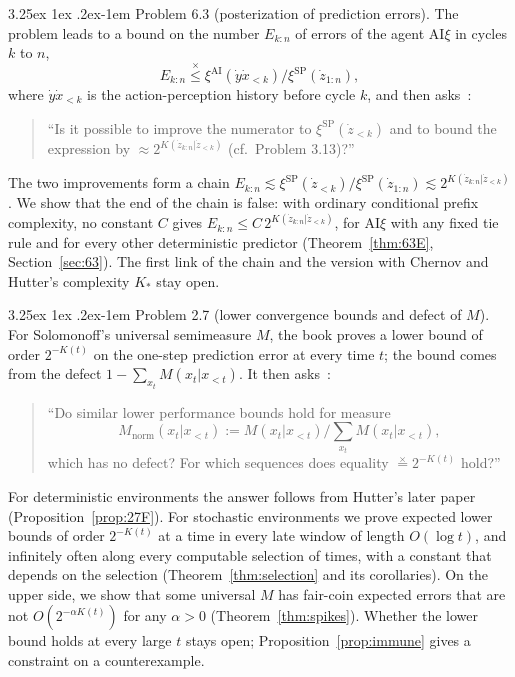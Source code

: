 \documentclass[11pt]{article}
\makeatletter
\renewcommand\paragraph{\@startsection{paragraph}{4}{\z@}%
  {3.25ex \@plus1ex \@minus.2ex}{-1em}%
  {\normalfont\normalsize\bfseries\boldmath}}
\newcommand{\Mnorm}{M_{\mathrm{norm}}}
\newcommand{\leqx}{\mathrel{\stackrel{\times}{\leq}}}
\newcommand{\eqx}{\mathrel{\stackrel{\times}{=}}}
\newcommand{\AI}{\mathrm{AI}}
\newcommand{\SP}{\mathrm{SP}}
\newcommand{\AIxi}{\textup{AI}\ensuremath{\xi}}
\theoremstyle{definition}
\theoremstyle{remark}
\makeatother
\begin{document}
\paragraph{Problem 6.3 (posterization of prediction errors).}
The problem leads to a bound on the number $E_{k:n}$ of errors of the agent
\AIxi{} in cycles $k$ to $n$,
\[
E_{k:n}\leqx\xi^{\AI}(\dot y\dot x_{<k})/\xi^{\SP}(\dot z_{1:n}),
\]
where $\dot y\dot x_{<k}$ is the action-perception history before cycle $k$,
and then asks~\cite[p.~208]{hutter2005uai}:
\begin{quote}
``Is it possible to improve the numerator to $\xi^{\SP}(\dot z_{<k})$ and to
bound the expression by $\approx 2^{K(\dot z_{k:n}|\dot z_{<k})}$ (cf.\ Problem 3.13)?''
\end{quote}
The two improvements form a chain
$E_{k:n}\lesssim \xi^{\SP}(\dot z_{<k})/\xi^{\SP}(\dot z_{1:n})\lesssim 2^{K(\dot z_{k:n}|\dot z_{<k})}$.
We show that the end of the chain is false: with ordinary conditional prefix
complexity, no constant $C$ gives
$E_{k:n}\le C\,2^{K(\dot z_{k:n}|\dot z_{<k})}$, for \AIxi{} with any fixed tie
rule and for every other deterministic predictor
(Theorem~\ref{thm:63E}, Section~\ref{sec:63}). The first link of the chain and
the version with Chernov and Hutter's complexity $K_*$ stay open.

\paragraph{Problem 2.7 (lower convergence bounds and defect of $M$).}
For Solomonoff's universal semimeasure $M$, the book proves a lower bound of
order $2^{-K(t)}$ on the one-step prediction error at every time $t$; the bound
comes from the defect $1-\sum_{x_t}M(x_t|x_{<t})$. It then
asks~\cite[p.~62]{hutter2005uai}:
\begin{quote}
``Do similar lower performance bounds hold for measure
\[\Mnorm(x_t|x_{<t}):=M(x_t|x_{<t})/\textstyle\sum_{x_t}M(x_t|x_{<t}),\]
which has no defect? For which sequences does equality $\eqx 2^{-K(t)}$ hold?''
\end{quote}
For deterministic environments the answer follows from Hutter's later
paper~\cite{hutter2007bayesconf} (Proposition~\ref{prop:27F}). For stochastic
environments we prove expected lower bounds of order $2^{-K(t)}$ at a time in
every late window of length $O(\log t)$, and infinitely often along every
computable selection of times, with a constant that depends on the selection
(Theorem~\ref{thm:selection} and its corollaries). On the upper side, we show that some universal $M$ has fair-coin
expected errors that are not $O(2^{-\alpha K(t)})$ for any $\alpha>0$
(Theorem~\ref{thm:spikes}). Whether the lower bound holds at every large $t$
stays open; Proposition~\ref{prop:immune} gives a constraint on a
counterexample.
\end{document}
